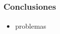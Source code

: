 \frame
{
\frametitle{Conclusiones}
\framesubtitle{}
\begin{itemize}
	\item problemas
\end{itemize}
}
